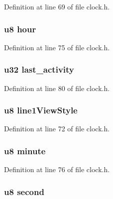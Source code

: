 \-Definition at line 69 of file clock.\-h.

\hypertarget{structtime_aee425ac71759c167362d22f272d89804}{
\subsubsection[{hour}]{\setlength{\rightskip}{0pt plus 5cm}u8 {\bf hour}}}\label{structtime_aee425ac71759c167362d22f272d89804}


\-Definition at line 75 of file clock.\-h.

\hypertarget{structtime_a2c7b985e90dbecdd0324cf732375d4ed}{
\subsubsection[{last\-\_\-activity}]{\setlength{\rightskip}{0pt plus 5cm}u32 {\bf last\-\_\-activity}}}\label{structtime_a2c7b985e90dbecdd0324cf732375d4ed}


\-Definition at line 80 of file clock.\-h.

\hypertarget{structtime_ae1915be5ea33290542c98fcc2ec95f8c}{
\subsubsection[{line1\-View\-Style}]{\setlength{\rightskip}{0pt plus 5cm}u8 {\bf line1\-View\-Style}}}\label{structtime_ae1915be5ea33290542c98fcc2ec95f8c}


\-Definition at line 72 of file clock.\-h.

\hypertarget{structtime_ae0a353dafc35c2935794f93a4e473a19}{
\subsubsection[{minute}]{\setlength{\rightskip}{0pt plus 5cm}u8 {\bf minute}}}\label{structtime_ae0a353dafc35c2935794f93a4e473a19}


\-Definition at line 76 of file clock.\-h.

\hypertarget{structtime_abaa2f1dd9c0722c3f314a8d3505fe630}{
\subsubsection[{second}]{\setlength{\rightskip}{0pt plus 5cm}u8 {\bf second}}}\label{structtime_abaa2f1dd9c0722c3f314a8d3505fe630}


